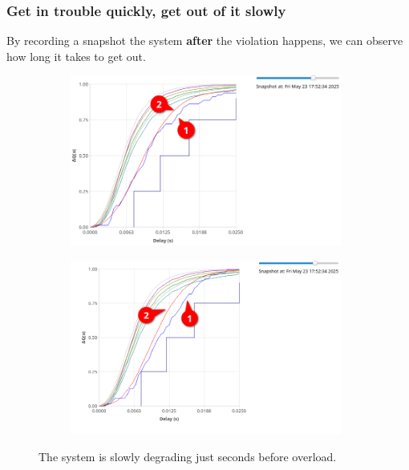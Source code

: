         \subsubsection{Get in trouble quickly, get out of it slowly}
            By recording a snapshot the system \textbf{after} the violation happens, we can observe how long it takes to get out. 
        \begin{figure}[H]
            \centering
            \begin{subfigure}{.5\textwidth}
                \centering
                \includegraphics[width=0.98\textwidth]{img/getting_bacl1.png}
                \label{fig:recup_1}
            \end{subfigure}%
            \begin{subfigure}{.5\textwidth}
                \centering
                \includegraphics[width =0.98\textwidth]{img/still_bad12.png}
                \label{fig:recup_2}
            \end{subfigure}
            \label{fig:recup}
            \caption{The system is slowly degrading just seconds before overload.}
            \end{figure}
            

